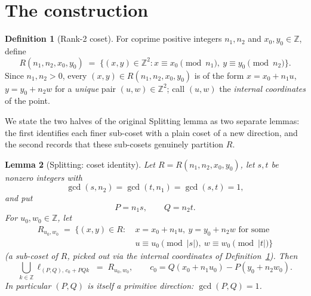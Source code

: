 \documentclass[a4paper,11pt,oneside,reqno]{amsart}
\theoremstyle{definition}
\newtheorem{definition}{Definition}
\theoremstyle{remark}
\theoremstyle{plain}
\newtheorem{lemma}[definition]{Lemma}
\newcommand{\Z}{\mathbb{Z}}
\begin{document}
\section{The construction}
\label{sec:construction}

\begin{definition}[Rank-2 coset]
  \label{def:Rcoset}
  For coprime positive integers \(n_1,n_2\) and \(x_0,y_0\in\Z\), define
  \begin{equation}
    \label{eq:Rcoset-def}
    R(n_1,n_2,x_0,y_0) \;=\; \{(x,y)\in\Z^2 : x\equiv x_0\!\!\pmod{n_1},\ y\equiv y_0\!\!\pmod{n_2}\}.
  \end{equation}
  Since \(n_1,n_2>0\), every \((x,y)\in R(n_1,n_2,x_0,y_0)\) is of the form \(x=x_0+n_1u\), \(y=y_0+n_2w\)
  for a \emph{unique} pair \((u,w)\in\Z^2\); call \((u,w)\) the \emph{internal coordinates} of the
  point.
\end{definition}

We state the two halves of the original Splitting lemma as two separate lemmas: the first
identifies each finer sub-coset with a plain coset of a new direction, and the second records that
these sub-cosets genuinely partition \(R\).

\begin{lemma}[Splitting: coset identity]
  \label{lem:splitting-coset}
  Let \(R=R(n_1,n_2,x_0,y_0)\), let \(s,t\) be nonzero integers with
  \begin{equation}
    \label{eq:splitting-hyps}
    \tag{H}
    \gcd(s,n_2)=\gcd(t,n_1)=\gcd(s,t)=1,
  \end{equation}
  and put
  \begin{equation}
    \label{eq:PQ-def}
    P=n_1s, \qquad Q=n_2t.
  \end{equation}
  For \(u_0,w_0\in\Z\), let
  \begin{equation}
    \label{eq:Rsub-def}
    \begin{aligned}
      R_{u_0,w_0} \;=\; \{(x,y)\in R :\ & x=x_0+n_1u,\ y=y_0+n_2w \text{ for some } \\
      & u\equiv u_0\!\!\pmod{|s|},\ w\equiv w_0\!\!\pmod{|t|}\}
    \end{aligned}
  \end{equation}
  (a sub-coset of \(R\), picked out via the internal coordinates of Definition~\ref{def:Rcoset}).
  Then
  \begin{equation}
    \label{eq:splitting-coset-conclusion}
    \tag{S}
    \bigcup_{k\in\Z} \ell_{(P,Q),\,c_0+PQk} \;=\; R_{u_0,w_0}, \qquad c_0 =
    Q(x_0+n_1u_0)-P(y_0+n_2w_0).
  \end{equation}
  In particular \((P,Q)\) is itself a primitive direction: \(\gcd(P,Q)=1\).
\end{lemma}
\end{document}
